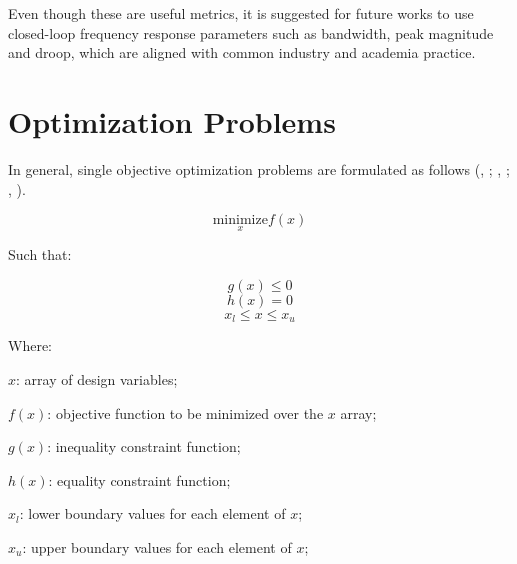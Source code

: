 Even though these are useful metrics, it is suggested for future works to use closed-loop frequency response parameters such as bandwidth, peak magnitude and droop, which are aligned with common industry and academia practice.

\section{Optimization Problems} \label{2-3-OptimizationProblems}

In general, single objective optimization problems are formulated as follows (\citeauthor{Messac}, \citeyear{Messac}; \citeauthor{Rao}, \citeyear{Rao}; \citeauthor{Fletcher}, \citeyear{Fletcher}).

\begin{equation}
\label{eq:2_2_OptimizationFormulation}
\underset{x}{\text{minimize}} f(x)
\end{equation}

Such that:

\begin{equation}
\label{eq:2_2_IneqConstOptimizationFormulation}
g(x) \leq 0
\end{equation}
\begin{equation}
\label{eq:2_2_EqConstOptimizationFormulation}
h(x) = 0
\end{equation}
\begin{equation}
\label{eq:2_2_BoundsOptimizationFormulation}
x_l \leq x \leq x_u
\end{equation}

Where:

\begin{description}
	\item \hspace{20pt}$x$: array of design variables;
	\item \hspace{20pt}$f(x)$: objective function to be minimized over the $x$ array;
	\item \hspace{20pt}$g(x)$: inequality constraint function;
	\item \hspace{20pt}$h(x)$: equality constraint function;
	\item \hspace{20pt}$x_l$: lower boundary values for each element of $x$;
	\item \hspace{20pt}$x_u$: upper boundary values for each element of $x$;
\end{description}

